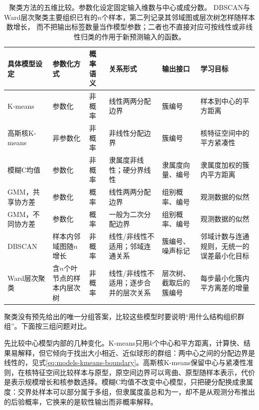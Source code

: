 \begin{table}[htbp]
  \centering
  \footnotesize
  \setlength{\tabcolsep}{4pt}
  \renewcommand{\arraystretch}{1.25}
  \begin{tabularx}{\linewidth}{@{}>{\raggedright\arraybackslash}p{28mm}>{\raggedright\arraybackslash}p{20mm}>{\raggedright\arraybackslash}p{14mm}>{\raggedright\arraybackslash}p{22mm}>{\raggedright\arraybackslash}p{20mm}>{\raggedright\arraybackslash}X@{}}
    \toprule
    \textbf{具体模型设定} & \textbf{参数化方式} & \textbf{概率语义} & \textbf{关系形式} & \textbf{输出接口} & \textbf{学习目标} \\
    \midrule
    K-means & 参数化 & 非概率 & 线性两两分配边界 & 簇编号 & 样本到中心的平方距离 \\
    高斯核K-means & 非参数化 & 非概率 & 非线性分配边界 & 簇编号 & 核特征空间中的平方紧凑性 \\
    模糊C均值 & 参数化 & 非概率 & 隶属度非线性；硬分界线性 & 隶属度向量、编号 & 隶属度加权的簇内平方距离 \\
    GMM，共享协方差 & 参数化 & 概率 & 线性两两分配边界 & 组别概率、编号 & 观测数据的似然 \\
    GMM，不同协方差 & 参数化 & 概率 & 一般为二次分配边界 & 组别概率、编号 & 观测数据的似然 \\
    DBSCAN & 样本内邻域图随$n$增长 & 非概率 & 线性/非线性不适用；邻域连通关系 & 簇编号、噪声标记 & 邻域计数与连通规则，无统一的误差最小化目标 \\
    Ward层次聚类 & 含$n$个叶节点的样本内层次树 & 非概率 & 线性/非线性不适用；逐步合并的层次关系 & 层次树、截取后的簇编号 & 每步最小化簇内平方离差的增量 \\
    \bottomrule
  \end{tabularx}
  \caption{聚类方法的五维比较。参数化设定固定输入维数与中心或成分数。
  DBSCAN与Ward层次聚类主要组织已有的$n$个样本，第二列记录其邻域图或层次树怎样随样本数增长，
  而不把输出标签数量当作模型参数；二者也不直接对应可按线性或非线性归类的作用于新预测输入的函数。}
  \label{tab:models-clusterers}
\end{table}

聚类没有预先给出的唯一分组答案，比较这些模型时要说明“用什么结构组织群组”。下面按三组问题对比。

先比较中心模型内部的几种变化。K-means只用$k$个中心和平方距离，计算快、结果易解释，但它倾向于找出大小相近、近似球形的群组：两中心之间的分配边界是线性的，见式\eqref{eq:models-kmeans-boundary}。高斯核K-means保留中心与紧凑性准则，在核特征空间比较样本与原型，原空间边界可以弯曲、原型随样本表示，代价是表示规模增长和核参数选择。模糊C均值不改变中心模型，只把硬分配换成隶属度：交界处样本可以部分属于多组，但隶属度虽总和为一，却不是从观测分布推出的后验概率，它换来的是软性输出而非概率解释。

